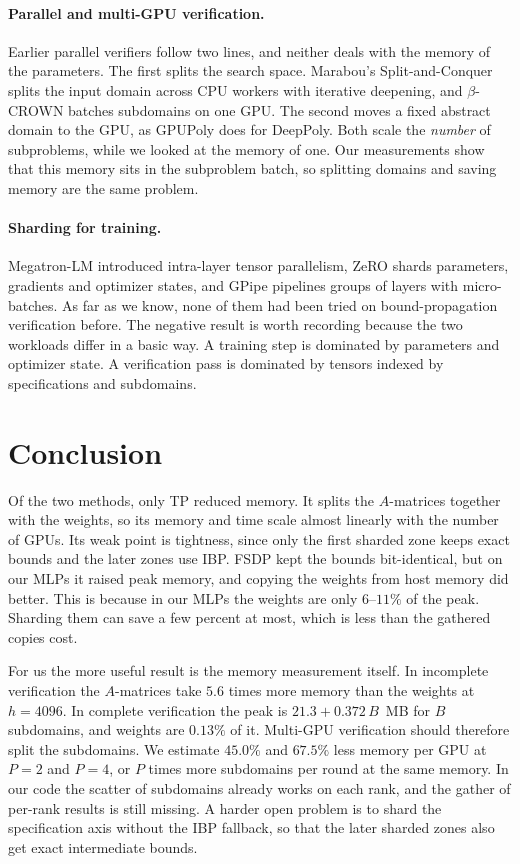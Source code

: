 \documentclass[runningheads]{llncs}
\begin{document}
\paragraph{Parallel and multi-GPU verification.} Earlier parallel verifiers
follow two lines, and neither deals with the memory of the parameters. The
first splits the search space. Marabou's Split-and-Conquer
\cite{Wu2020Parallelization} splits the input domain across CPU workers
with iterative deepening, and $\beta$-CROWN \cite{betaCROWN2021} batches
subdomains on one GPU. The second moves a fixed abstract domain to the GPU, as
GPUPoly \cite{ScalingPolyhedralGPU} does for DeepPoly. Both scale the
\emph{number} of subproblems, while we looked at the memory of one. Our
measurements show that this memory sits in the subproblem batch, so splitting
domains and saving memory are the same problem.

\paragraph{Sharding for training.} Megatron-LM \cite{MegatronLM2020} introduced
intra-layer tensor parallelism, ZeRO \cite{ZeROPaper} shards parameters,
gradients and optimizer states, and GPipe \cite{GPipePaper} pipelines groups
of layers with micro-batches. As far as we know, none of them had been tried on
bound-propagation verification before. The negative result is worth recording
because the two workloads differ in a basic way. A training step is dominated
by parameters and optimizer state. A verification pass is dominated by tensors
indexed by specifications and subdomains.

\section{Conclusion}
\label{sec:conclusion}

Of the two methods, only TP reduced memory. It splits the $A$-matrices together
with the weights, so its memory and time scale almost linearly with the number
of GPUs. Its weak point is tightness, since only the first sharded zone keeps
exact bounds and the later zones use IBP. FSDP kept the bounds bit-identical,
but on our MLPs it raised peak memory, and copying the weights from host memory
did better. This is because in our MLPs the weights are only $6$--$11\%$ of the
peak. Sharding them can save a few percent at most, which is less than the
gathered copies cost.

For us the more useful result is the memory measurement itself. In incomplete
verification the $A$-matrices take $5.6$ times more memory than the weights at
$h{=}4096$. In complete verification the peak is $21.3 + 0.372\,B$~MB for $B$
subdomains, and weights are $0.13\%$ of it. Multi-GPU verification should
therefore split the subdomains. We estimate $45.0\%$ and $67.5\%$ less memory
per GPU at $P{=}2$ and $P{=}4$, or $P$ times more subdomains per round at the
same memory. In our code the scatter of subdomains already works on each rank,
and the gather of per-rank results is still missing. A harder open problem is
to shard the specification axis without the IBP fallback, so that the later
sharded zones also get exact intermediate bounds.
\end{document}
